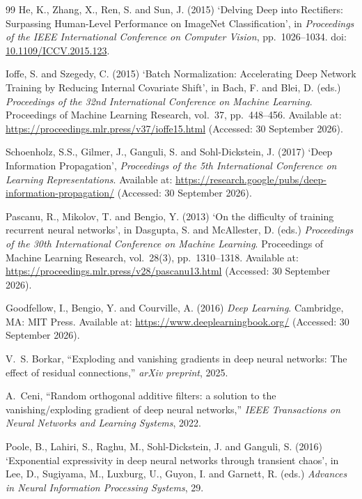 \documentclass[12pt]{article}
\begin{document}
\begin{thebibliography}{99}
He, K., Zhang, X., Ren, S. and Sun, J. (2015) `Delving Deep into Rectifiers:
Surpassing Human-Level Performance on ImageNet Classification', in
\textit{Proceedings of the IEEE International Conference on Computer Vision},
pp.~1026--1034. doi:
\href{https://doi.org/10.1109/ICCV.2015.123}{10.1109/ICCV.2015.123}.

Ioffe, S. and Szegedy, C. (2015) `Batch Normalization: Accelerating Deep
Network Training by Reducing Internal Covariate Shift', in Bach, F. and Blei,
D. (eds.) \textit{Proceedings of the 32nd International Conference on Machine
Learning}. Proceedings of Machine Learning Research, vol.~37, pp.~448--456.
Available at: \url{https://proceedings.mlr.press/v37/ioffe15.html}
(Accessed: 30 September 2026).

Schoenholz, S.S., Gilmer, J., Ganguli, S. and Sohl-Dickstein, J. (2017) `Deep
Information Propagation', \textit{Proceedings of the 5th International
Conference on Learning Representations}. Available at:
\url{https://research.google/pubs/deep-information-propagation/}
(Accessed: 30 September 2026).

Pascanu, R., Mikolov, T. and Bengio, Y. (2013) `On the difficulty of training
recurrent neural networks', in Dasgupta, S. and McAllester, D. (eds.)
\textit{Proceedings of the 30th International Conference on Machine Learning}.
Proceedings of Machine Learning Research, vol.~28(3), pp.~1310--1318.
Available at: \url{https://proceedings.mlr.press/v28/pascanu13.html}
(Accessed: 30 September 2026).

Goodfellow, I., Bengio, Y. and Courville, A. (2016) \textit{Deep Learning}.
Cambridge, MA: MIT Press. Available at:
\url{https://www.deeplearningbook.org/}
(Accessed: 30 September 2026).

V.~S. Borkar,
\newblock ``Exploding and vanishing gradients in deep neural networks: The effect of residual connections,''
\newblock \emph{arXiv preprint}, 2025.

A.~Ceni,
\newblock ``Random orthogonal additive filters: a solution to the vanishing/exploding gradient of deep neural networks,''
\newblock \emph{IEEE Transactions on Neural Networks and Learning Systems}, 2022.

Poole, B., Lahiri, S., Raghu, M., Sohl-Dickstein, J. and Ganguli, S. (2016)
`Exponential expressivity in deep neural networks through transient chaos',
in Lee, D., Sugiyama, M., Luxburg, U., Guyon, I. and Garnett, R. (eds.)
\textit{Advances in Neural Information Processing Systems}, 29.


\end{thebibliography}
\end{document}
